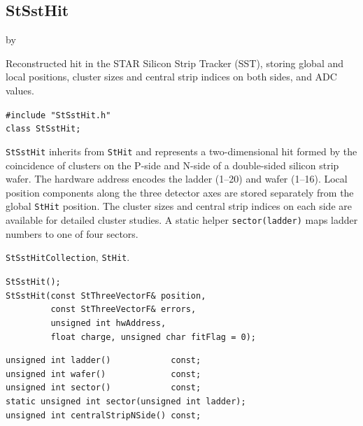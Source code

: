 \documentclass[twoside]{article}
\newcommand{\entrylabel}[1]{\mbox{\textbf{{#1}}}\hfil}%
\newenvironment{entry}
{\begin{list}{}%
    {\renewcommand{\makelabel}{\entrylabel}%
     \setlength{\labelwidth}{90pt}%
     \setlength{\leftmargin}{\labelwidth}
     \advance\leftmargin by \labelsep%
      }%
    }%
  {\end{list}}
\newcommand{\Entrylabel}[1]%
{\raisebox{0pt}[1ex][0pt]{\makebox[\labelwidth][l]%
    {\parbox[t]{\labelwidth}{\hspace{0pt}\textbf{{#1}}}}}}
\newenvironment{Entry}%
{\renewcommand{\entrylabel}{\Entrylabel}\begin{entry}}%
  {\end{entry}}
\begin{document}
\subsection{StSstHit}
\label{sec:StSstHit}
\begin{Entry}
\item[Summary] Reconstructed hit in the STAR Silicon Strip Tracker (SST),
    storing global and local positions, cluster sizes and central strip indices
    on both sides, and ADC values.
\item[Synopsis]
    \verb+#include "StSstHit.h"+\\
    \verb+class StSstHit;+\\
\item[Description]
    \texttt{StSstHit} inherits from \texttt{StHit} and represents a
    two-dimensional hit formed by the coincidence of clusters on the P-side and
    N-side of a double-sided silicon strip wafer.  The hardware address encodes
    the ladder (1--20) and wafer (1--16).  Local position components along the
    three detector axes are stored separately from the global \texttt{StHit}
    position.  The cluster sizes and central strip indices on each side are
    available for detailed cluster studies.  A static helper
    \verb+sector(ladder)+ maps ladder numbers to one of four sectors.
\item[Related Classes]
    \texttt{StSstHitCollection}, \texttt{StHit}.
\item[Public\\ Constructors]
    \verb+StSstHit();+\\
    \verb+StSstHit(const StThreeVectorF& position,+\\
    \verb+         const StThreeVectorF& errors,+\\
    \verb+         unsigned int hwAddress,+\\
    \verb+         float charge, unsigned char fitFlag = 0);+\\
\item[Public Member\\ Functions]
    \verb+unsigned int ladder()            const;+\\
    \verb+unsigned int wafer()             const;+\\
    \verb+unsigned int sector()            const;+\\
    \verb+static unsigned int sector(unsigned int ladder);+\\
    \verb+unsigned int centralStripNSide() const;+\\

\end{Entry}
\end{document}
